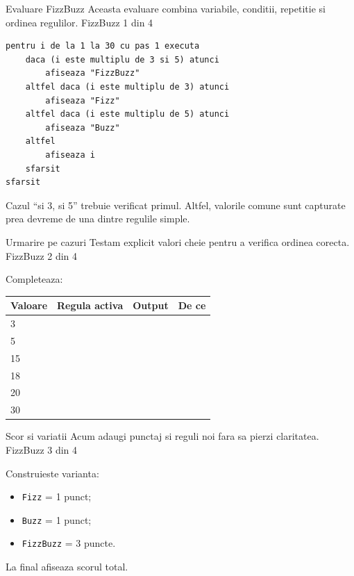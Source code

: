 \PageHeader
  {Evaluare FizzBuzz}
  {Aceasta evaluare combina variabile, conditii, repetitie si ordinea regulilor.}
  {FizzBuzz 1 din 4}

\begin{missionbox}
\begin{lstlisting}[style=codequest]
pentru i de la 1 la 30 cu pas 1 executa
    daca (i este multiplu de 3 si 5) atunci
        afiseaza "FizzBuzz"
    altfel daca (i este multiplu de 3) atunci
        afiseaza "Fizz"
    altfel daca (i este multiplu de 5) atunci
        afiseaza "Buzz"
    altfel
        afiseaza i
    sfarsit
sfarsit
\end{lstlisting}
\end{missionbox}

\begin{conceptbox}
Cazul ``si 3, si 5'' trebuie verificat primul. Altfel, valorile comune sunt capturate prea devreme de una dintre regulile simple.
\end{conceptbox}

\clearpage

\PageHeader
  {Urmarire pe cazuri}
  {Testam explicit valori cheie pentru a verifica ordinea corecta.}
  {FizzBuzz 2 din 4}

\begin{guidebox}
Completeaza:
\begin{center}
\begin{tabular}{llll}
\toprule
Valoare & Regula activa & Output & De ce \\
\midrule
3 & & & \\
5 & & & \\
15 & & & \\
18 & & & \\
20 & & & \\
30 & & & \\
\bottomrule
\end{tabular}
\end{center}
\end{guidebox}

\clearpage

\PageHeader
  {Scor si variatii}
  {Acum adaugi punctaj si reguli noi fara sa pierzi claritatea.}
  {FizzBuzz 3 din 4}

\begin{solobox}
Construieste varianta:
\begin{itemize}
\item \texttt{Fizz} = 1 punct;
\item \texttt{Buzz} = 1 punct;
\item \texttt{FizzBuzz} = 3 puncte.
\end{itemize}
La final afiseaza scorul total.
\end{solobox}

